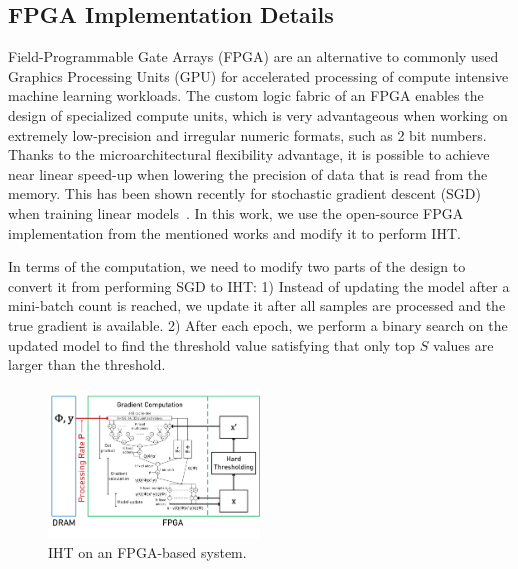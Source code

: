 \subsection{FPGA Implementation Details} \label{sec:fpga}

Field-Programmable Gate Arrays (FPGA) are an alternative to commonly used Graphics Processing Units (GPU) for accelerated processing of compute intensive machine learning workloads. The custom logic fabric of an FPGA enables the design of specialized compute units, which is very advantageous when working on extremely low-precision and irregular numeric formats, such as 2 bit numbers. Thanks to the microarchitectural flexibility advantage, it is possible to achieve near linear speed-up when lowering the precision of data that is read from the memory. This has been shown recently for stochastic gradient descent (SGD) when training linear models~\cite{zhang2017zipml, kara2017fpga}. In this work, we use the open-source FPGA implementation from the mentioned works and modify it to perform IHT.

In terms of the computation, we need to modify two parts of the design to convert it from performing SGD to IHT: 1) Instead of updating the model after a mini-batch count is reached, we update it after all samples are processed and the true gradient is available. 2) After each epoch, we perform a binary search on the updated model to find the threshold value satisfying that only top $S$ values are larger than the  threshold.

\begin{figure}[t!]
\centering
\includegraphics[width=0.5\textwidth, angle=0]{../figs/niht_fpga.pdf}
\caption{IHT on an FPGA-based system.}
\label{fig:fpga}
\end{figure}


